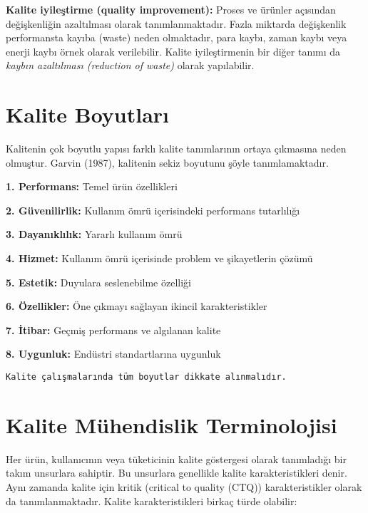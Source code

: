 \documentclass[
]{book}
\begin{document}
\textbf{Kalite iyileştirme (quality improvement):} Proses ve ürünler açısından değişkenliğin azaltılması olarak tanımlanmaktadır. Fazla miktarda değişkenlik performansta kayıba (waste) neden olmaktadır, para kaybı, zaman kaybı veya enerji kaybı örnek olarak verilebilir. Kalite iyileştirmenin bir diğer tanımı da \emph{kaybın azaltılması (reduction of waste)} olarak yapılabilir.

\hypertarget{kalite-boyutlarux131}{%
\section{Kalite Boyutları}\label{kalite-boyutlarux131}}

Kalitenin çok boyutlu yapısı farklı kalite tanımlarının ortaya çıkmasına neden olmuştur. Garvin (1987), kalitenin sekiz boyutunu şöyle tanımlamaktadır.

\textbf{1. Performans:} Temel ürün özellikleri

\textbf{2. Güvenilirlik:} Kullanım ömrü içerisindeki performans tutarlılığı

\textbf{3. Dayanıklılık:} Yararlı kullanım ömrü

\textbf{4. Hizmet:} Kullanım ömrü içerisinde problem ve şikayetlerin çözümü

\textbf{5. Estetik:} Duyulara seslenebilme özelliği

\textbf{6. Özellikler:} Öne çıkmayı sağlayan ikincil karakteristikler

\textbf{7. İtibar:} Geçmiş performans ve algılanan kalite

\textbf{8. Uygunluk:} Endüstri standartlarına uygunluk

\begin{verbatim}
Kalite çalışmalarında tüm boyutlar dikkate alınmalıdır.
\end{verbatim}

\hypertarget{kalite-muxfchendislik-terminolojisi}{%
\section{Kalite Mühendislik Terminolojisi}\label{kalite-muxfchendislik-terminolojisi}}

Her ürün, kullanıcının veya tüketicinin kalite göstergesi olarak tanımladığı bir takım unsurlara sahiptir. Bu unsurlara genellikle kalite karakteristikleri denir. Aynı zamanda kalite için kritik (critical to quality (CTQ)) karakteristikler olarak da tanımlanmaktadır. Kalite karakteristikleri birkaç türde olabilir:
\end{document}
